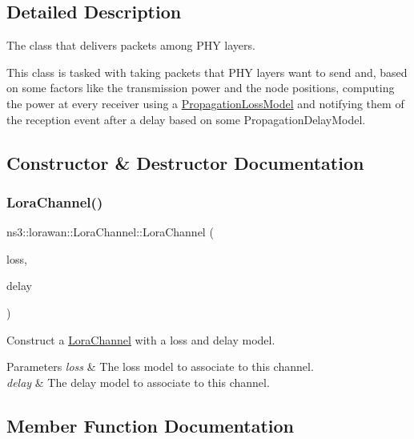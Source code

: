 \subsection{Detailed Description}
The class that delivers packets among P\+HY layers.

This class is tasked with taking packets that P\+HY layers want to send and, based on some factors like the transmission power and the node positions, computing the power at every receiver using a \hyperlink{classPropagationLossModel}{Propagation\+Loss\+Model} and notifying them of the reception event after a delay based on some Propagation\+Delay\+Model. 

\subsection{Constructor \& Destructor Documentation}
\mbox{\label{classns3_1_1lorawan_1_1LoraChannel_aba4c1b5203d4d8010e9e7485cc9e7721}} 
\subsubsection{\texorpdfstring{Lora\+Channel()}{LoraChannel()}}
{\footnotesize\ttfamily ns3\+::lorawan\+::\+Lora\+Channel\+::\+Lora\+Channel (\begin{DoxyParamCaption}\item[{Ptr$<$ \hyperlink{classPropagationLossModel}{Propagation\+Loss\+Model} $>$}]{loss,  }\item[{Ptr$<$ Propagation\+Delay\+Model $>$}]{delay }\end{DoxyParamCaption})}

Construct a \hyperlink{classns3_1_1lorawan_1_1LoraChannel}{Lora\+Channel} with a loss and delay model.


\begin{DoxyParams}{Parameters}
{\em loss} & The loss model to associate to this channel. \\
\hline
{\em delay} & The delay model to associate to this channel. \\
\hline
\end{DoxyParams}


\subsection{Member Function Documentation}
\mbox{\label{classns3_1_1lorawan_1_1LoraChannel_ac44d882080c3be8fb0f785c6ba29cae3}} 
